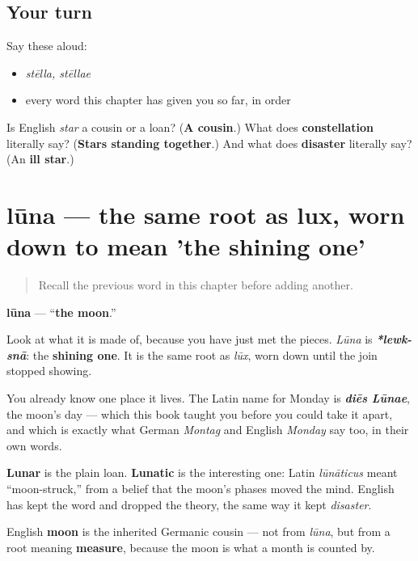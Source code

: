 \subsection*{Your turn}
Say these aloud:

\begin{itemize}
\raggedright
  \item \emph{stēlla, stēllae}
  \item every word this chapter has given you so far, in order
\end{itemize}

\begin{tcolorbox}[breakable,colback=teal!4,colframe=teal!35!black,title={Before you move on}]
Is English \emph{star} a cousin or a loan? (\textbf{A cousin}.) What does \textbf{constellation} literally say? (\textbf{Stars standing together}.) And what does \textbf{disaster} literally say? (An \textbf{ill star}.)
\end{tcolorbox}
\section[lūna, lūnae]{lūna — the same root as lux, worn down to mean 'the shining one'}

\label{lesson:LA-C46-luna}



\begin{quote}
Recall the previous word in this chapter before adding another.
\end{quote}

\begin{cousinweb}
\textbf{lūna} — \textquotedblleft{}\textbf{the moon}.\textquotedblright{}

Look at what it is made of, because you have just met the pieces. \emph{Lūna} is \emph{\textbf{*lewk-snā}}: the \textbf{shining one}. It is the same root as \emph{lūx}, worn down until the join stopped showing.

You already know one place it lives. The Latin name for Monday is \emph{\textbf{diēs Lūnae}}, the moon's day — which this book taught you before you could take it apart, and which is exactly what German \emph{Montag} and English \emph{Monday} say too, in their own words.

\textbf{Lunar} is the plain loan. \textbf{Lunatic} is the interesting one: Latin \emph{lūnāticus} meant \textquotedblleft{}moon-struck,\textquotedblright{} from a belief that the moon's phases moved the mind. English has kept the word and dropped the theory, the same way it kept \emph{disaster}.

English \textbf{moon} is the inherited Germanic cousin — not from \emph{lūna}, but from a root meaning \textbf{measure}, because the moon is what a month is counted by.
\end{cousinweb}

